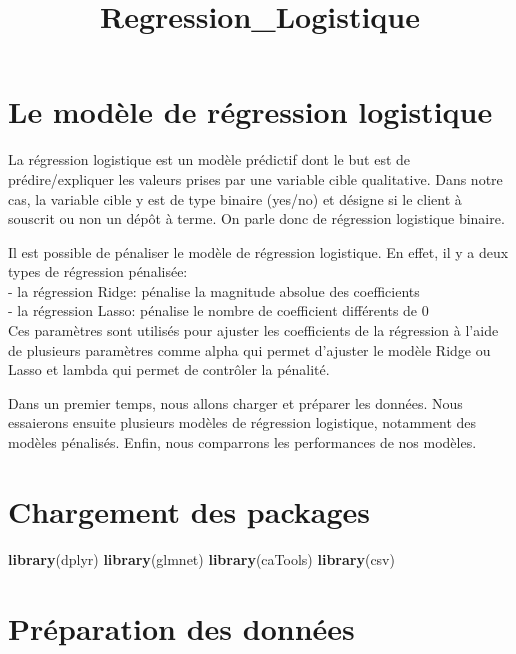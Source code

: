 \documentclass[
]{article}
\title{Regression\_Logistique}
\author{}
\date{\vspace{-2.5em}}
\newenvironment{Shaded}{\begin{snugshade}}{\end{snugshade}}
\newcommand{\KeywordTok}[1]{\textcolor[rgb]{0.13,0.29,0.53}{\textbf{#1}}}
\newcommand{\NormalTok}[1]{#1}
\begin{document}
\maketitle

\hypertarget{le-moduxe8le-de-ruxe9gression-logistique}{%
\section{Le modèle de régression
logistique}\label{le-moduxe8le-de-ruxe9gression-logistique}}

La régression logistique est un modèle prédictif dont le but est de
prédire/expliquer les valeurs prises par une variable cible qualitative.
Dans notre cas, la variable cible y est de type binaire (yes/no) et
désigne si le client à souscrit ou non un dépôt à terme. On parle donc
de régression logistique binaire.

Il est possible de pénaliser le modèle de régression logistique. En
effet, il y a deux types de régression pénalisée:\\
- la régression Ridge: pénalise la magnitude absolue des coefficients\\
- la régression Lasso: pénalise le nombre de coefficient différents de
0\\
Ces paramètres sont utilisés pour ajuster les coefficients de la
régression à l'aide de plusieurs paramètres comme alpha qui permet
d'ajuster le modèle Ridge ou Lasso et lambda qui permet de contrôler la
pénalité.

Dans un premier temps, nous allons charger et préparer les données. Nous
essaierons ensuite plusieurs modèles de régression logistique, notamment
des modèles pénalisés. Enfin, nous comparrons les performances de nos
modèles.

\hypertarget{chargement-des-packages}{%
\section{Chargement des packages}\label{chargement-des-packages}}

\begin{Shaded}
\begin{Highlighting}[]
\KeywordTok{library}\NormalTok{(dplyr)}
\KeywordTok{library}\NormalTok{(glmnet)}
\KeywordTok{library}\NormalTok{(caTools)}
\KeywordTok{library}\NormalTok{(csv)}
\end{Highlighting}
\end{Shaded}

\hypertarget{pruxe9paration-des-donnuxe9es}{%
\section{Préparation des données}\label{pruxe9paration-des-donnuxe9es}}
\end{document}
